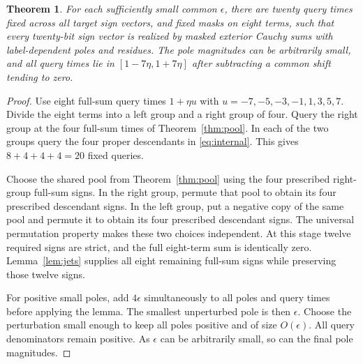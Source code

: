 \documentclass[11pt]{article}
\newtheorem{theorem}{Theorem}
\begin{document}
\begin{theorem}\label{thm:twenty}
For each sufficiently small common $\epsilon$, there are twenty query times
fixed across all target sign vectors, and fixed masks on eight terms, such
that every twenty-bit sign vector is realized by masked exterior Cauchy
sums with label-dependent poles and residues. The pole magnitudes can
be arbitrarily small, and all query times lie in $[1-7\eta,1+7\eta]$
after subtracting a common shift tending to zero.
\end{theorem}
\begin{proof}
Use eight full-sum query times $1+\eta u$ with
$u=-7,-5,-3,-1,1,3,5,7$. Divide the eight terms into a left group
and a right group of four. Query the right group at the four full-sum
times of Theorem~\ref{thm:pool}. In each of the two groups query the
four proper descendants in \eqref{eq:internal}. This gives
$8+4+4+4=20$ fixed queries.

Choose the shared pool from Theorem~\ref{thm:pool} using the four
prescribed right-group full-sum signs. In the right group, permute that
pool to obtain its four prescribed descendant signs. In the left group,
put a negative copy of the same pool and permute it to obtain its four
prescribed descendant signs. The universal permutation property makes
these two choices independent. At this stage twelve required signs
are strict, and the full eight-term sum is identically zero.
Lemma~\ref{lem:jets} supplies all eight remaining full-sum signs while
preserving those twelve signs.

For positive small poles, add $4\epsilon$ simultaneously to all poles
and query times before applying the lemma. The smallest unperturbed
pole is then $\epsilon$. Choose the perturbation small enough to keep
all poles positive and of size $O(\epsilon)$. All query denominators
remain positive. As $\epsilon$ can be arbitrarily small, so can the
final pole magnitudes.
\end{proof}
\end{document}
